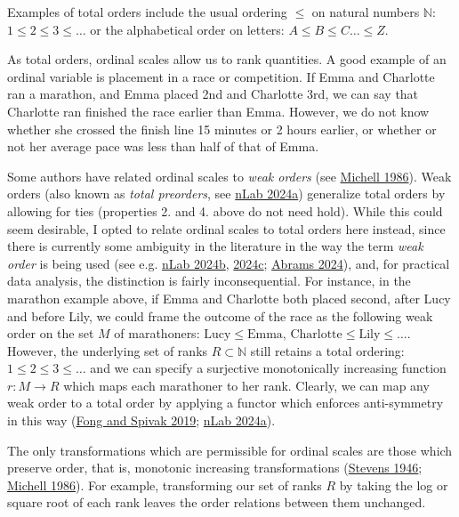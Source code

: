 \documentclass[
]{book}
\theoremstyle{definition}
\theoremstyle{definition}
\theoremstyle{definition}
\theoremstyle{definition}
\theoremstyle{remark}
\begin{document}
Examples of total orders include the usual ordering \(\leq\) on natural numbers \(\mathbb{N}\): \(1 \leq 2 \leq 3 \leq \ldots\) or the alphabetical order on letters: \(A \leq B \leq C \ldots \leq Z\).

As total orders, ordinal scales allow us to rank quantities. A good example of an ordinal variable is placement in a race or competition. If Emma and Charlotte ran a marathon, and Emma placed 2nd and Charlotte 3rd, we can say that Charlotte ran finished the race earlier than Emma. However, we do not know whether she crossed the finish line 15 minutes or 2 hours earlier, or whether or not her average pace was less than half of that of Emma.

Some authors have related ordinal scales to \emph{weak orders} (see \protect\hyperlink{ref-michell1986}{Michell 1986}). Weak orders (also known as \emph{total preorders}, see \protect\hyperlink{ref-nlab2024d}{nLab 2024a}) generalize total orders by allowing for ties (properties 2. and 4. above do not need hold). While this could seem desirable, I opted to relate ordinal scales to total orders here instead, since there is currently some ambiguity in the literature in the way the term \emph{weak order} is being used (see e.g. \protect\hyperlink{ref-nlab2024a}{nLab 2024b}, \protect\hyperlink{ref-nlab2024b}{2024c}; \protect\hyperlink{ref-stackexchange2024}{Abrams 2024}), and, for practical data analysis, the distinction is fairly inconsequential. For instance, in the marathon example above, if Emma and Charlotte both placed second, after Lucy and before Lily, we could frame the outcome of the race as the following weak order on the set \(M\) of marathoners: \(\text{Lucy} \leq \text{Emma, Charlotte} \leq \text{Lily} \leq ...\). However, the underlying set of ranks \(R \subset \mathbb{N}\) still retains a total ordering: \(1 \leq 2 \leq 3 \leq \ldots\) and we can specify a surjective monotonically increasing function \(r: M \to R\) which maps each marathoner to her rank. Clearly, we can map any weak order to a total order by applying a functor which enforces anti-symmetry in this way (\protect\hyperlink{ref-fong2019}{Fong and Spivak 2019}; \protect\hyperlink{ref-nlab2024d}{nLab 2024a}).

The only transformations which are permissible for ordinal scales are those which preserve order, that is, monotonic increasing transformations (\protect\hyperlink{ref-stevens1946}{Stevens 1946}; \protect\hyperlink{ref-michell1986}{Michell 1986}). For example, transforming our set of ranks \(R\) by taking the log or square root of each rank leaves the order relations between them unchanged.
\end{document}
